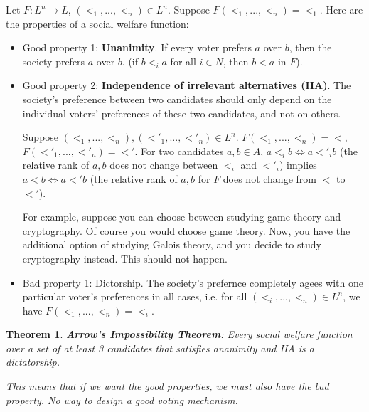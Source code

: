 \documentclass[twoside]{article}
\newcounter{lecnum}
\newtheorem{prototheorem}{Theorem}[lecnum]
\newenvironment{theorem}
{\colorlet{shadecolor}{orange!15}\begin{shaded}\begin{prototheorem}\normalfont}
		{\end{prototheorem}\end{shaded}}
\begin{document}
	Let $F: L^n \rightarrow L$, $(<_1, ..., <_n) \in L^n$. Suppose $F(<_1, ..., <_n) = <_1$. Here are the properties of a social welfare function: \begin{itemize}
	\item Good property 1: \textbf{Unanimity}. If every voter prefers $a$ over $b$, then the society prefers $a$ over $b$. (if $b <_i a$ for all $i \in N$, then $b < a$ in $F$). 
		
	\item Good property 2: \textbf{Independence of irrelevant alternatives (IIA)}. The society's preference between two candidates should only depend on the individual voters' preferences of these two candidates, and not on others. 
		
	Suppose $(<_1, ..., <_n), (<'_1, ..., <'_n) \in L^n$. $F(<_1, ..., <_n) = <$, $F(<'_1, ..., <'_n) = <'$. For two candidates $a, b \in A$, $a <_i b \Leftrightarrow a <'_i b$ (the relative rank of $a, b$ does not change between $<_i$ and $<'_i$) implies $a < b \Leftrightarrow a <' b$ (the relative rank of $a, b$ for $F$ does not change from $<$ to $<'$). 
		
	For example, suppose you can choose between studying game theory and cryptography. Of course you would choose game theory. Now, you have the additional option of studying Galois theory, and you decide to study cryptography instead. This should not happen. 
		
	\item Bad property 1: Dictorship. The society's prefernce completely agees with one particular voter's preferences in all cases, i.e. for all $(<_i, ..., <_n) \in L^n$, we have $F(<_1, ..., <_n) = <_i$. 
		
	\end{itemize}
	
	\begin{theorem}
		\textbf{Arrow's Impossibility Theorem}: Every social welfare function over a set of at least 3 candidates that satisfies ananimity and IIA is a dictatorship. 
			
		This means that if we want the good properties, we must also have the bad property. No way to design a good voting mechanism. 
	\end{theorem}
	
\end{document}
